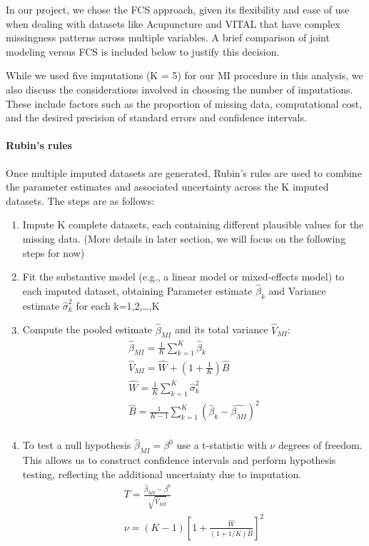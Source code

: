 \documentclass{article}
\begin{document}
In our project, we chose the FCS approach, given its flexibility and
ease of use when dealing with datasets like Acupuncture and VITAL that
have complex missingness patterns across multiple variables. A brief
comparison of joint modeling versus FCS is included below to justify
this decision.

While we used five imputations (K = 5) for our MI procedure in this
analysis, we also discuss the considerations involved in choosing the
number of imputations. These include factors such as the proportion of
missing data, computational cost, and the desired precision of standard
errors and confidence intervals.

\paragraph{Rubin's rules}\label{rubins-rules}

Once multiple imputed datasets are generated, Rubin's rules are used to
combine the parameter estimates and associated uncertainty across the K
imputed datasets. The steps are as follows:

\begin{enumerate}
\def\labelenumi{\arabic{enumi}.}
\item
  Impute K complete datasets, each containing different plausible values
  for the missing data. (More details in later section, we will focus on
  the following steps for now)
\item
  Fit the substantive model (e.g., a linear model or mixed-effects
  model) to each imputed dataset, obtaining Parameter estimate
  \(\hat{\beta}_{k}\) and Variance estimate \(\hat{\sigma}_{k}^{2}\) for
  each k=1,2,\ldots,K
\item
  Compute the pooled estimate \(\hat{\beta}_{MI}\) and its total
  variance \(\hat{V}_{MI}\): \begin{align*}
    \hat{\beta}_{MI} = \frac{1}{K} \sum_{k=1}^{K}{\hat{\beta}_{k}} \\
    \hat{V}_{MI} = \hat{W} + (1 + \frac{1}{K}) \hat{B} \\
    \hat{W} = \frac{1}{K} \sum^{K}_{k=1}{\hat{\sigma}^{2}_{k}} \\
    \hat{B} = \frac{1}{K-1} \sum^{K}_{k=1}({\hat{\beta}_{k}} - \hat{\beta_{MI}})^{2} \\
    \end{align*}
\item
  To test a null hypothesis \(\hat{\beta}_{MI} = \beta^{0}\) use a
  t-statistic with \(\nu\) degrees of freedom. This allows us to
  construct confidence intervals and perform hypothesis testing,
  reflecting the additional uncertainty due to imputation.
  \begin{align*}
    T = \frac{\hat{\beta}_{MI} - \beta^{0}}  {\sqrt{\hat{V}_{MI}}} \\
    \nu = (K-1)[1 + \frac{\hat{W}}{(1 + 1/K) \hat{B}}]^{2}
    \end{align*}
\end{enumerate}
\end{document}

